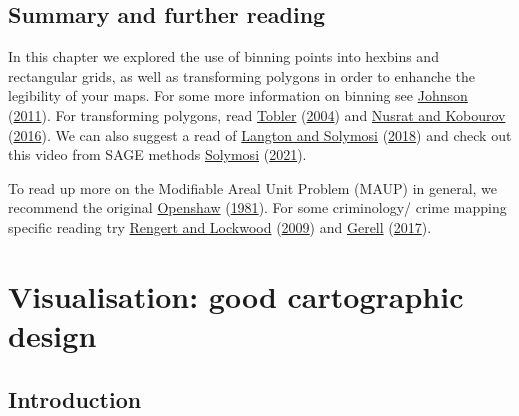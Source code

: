 \documentclass[
  krantz2]{krantz}
\begin{document}
\hypertarget{summary-and-further-reading-3}{%
\section{Summary and further reading}\label{summary-and-further-reading-3}}

In this chapter we explored the use of binning points into hexbins and rectangular grids, as well as transforming polygons in order to enhanche the legibility of your maps. For some more information on binning see \protect\hyperlink{ref-Johnson_2011}{Johnson} (\protect\hyperlink{ref-Johnson_2011}{2011}). For transforming polygons, read \protect\hyperlink{ref-Tobler_2004}{Tobler} (\protect\hyperlink{ref-Tobler_2004}{2004}) and \protect\hyperlink{ref-Nusrat_2016}{Nusrat and Kobourov} (\protect\hyperlink{ref-Nusrat_2016}{2016}). We can also suggest a read of \protect\hyperlink{ref-Langton_2018}{Langton and Solymosi} (\protect\hyperlink{ref-Langton_2018}{2018}) and check out this video from SAGE methods \protect\hyperlink{ref-Solymosi_2021}{Solymosi} (\protect\hyperlink{ref-Solymosi_2021}{2021}).

To read up more on the Modifiable Areal Unit Problem (MAUP) in general, we recommend the original \protect\hyperlink{ref-Openshaw_1981}{Openshaw} (\protect\hyperlink{ref-Openshaw_1981}{1981}). For some criminology/ crime mapping specific reading try \protect\hyperlink{ref-Rengert_2009}{Rengert and Lockwood} (\protect\hyperlink{ref-Rengert_2009}{2009}) and \protect\hyperlink{ref-Gerell_2017}{Gerell} (\protect\hyperlink{ref-Gerell_2017}{2017}).

\hypertarget{visualisation-good-cartographic-design}{%
\chapter{Visualisation: good cartographic design}\label{visualisation-good-cartographic-design}}

\hypertarget{introduction-4}{%
\section{Introduction}\label{introduction-4}}
\end{document}
